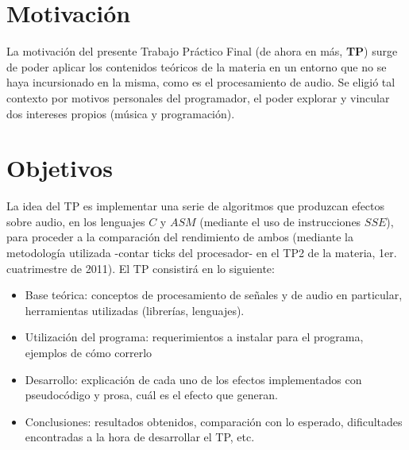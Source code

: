 \documentclass[a4paper,spanish,12pt]{article}
\begin{document}


    
    \maketitle
    

\section{Motivación}
\indent La motivación del presente Trabajo Práctico Final (de ahora en más, \textbf{TP}) surge de poder aplicar los contenidos teóricos de la materia en un entorno que no se haya incursionado en la misma, como es el procesamiento de audio. Se eligió tal contexto por motivos personales del programador, el poder explorar y vincular dos intereses propios (música y programación).

\section{Objetivos}
\indent La idea del TP es implementar una serie de algoritmos que produzcan efectos sobre audio, en los lenguajes $C$ y $ASM$ (mediante el uso de instrucciones $SSE$), para proceder a la comparación del rendimiento de ambos (mediante la metodología utilizada -contar ticks del procesador- en el TP2 de la materia, 1er. cuatrimestre de 2011). El TP consistirá en lo siguiente:
\begin{itemize}
\item Base teórica: conceptos de procesamiento de señales y de audio en particular, herramientas utilizadas (librerías, lenguajes).
\item Utilización del programa: requerimientos a instalar para el programa, ejemplos de cómo correrlo
\item Desarrollo: explicación de cada uno de los efectos implementados con pseudocódigo y prosa, cuál es el efecto que generan.
\item Conclusiones: resultados obtenidos, comparación con lo esperado, dificultades encontradas a la hora de desarrollar el TP, etc.
\end{itemize}
\end{document}

